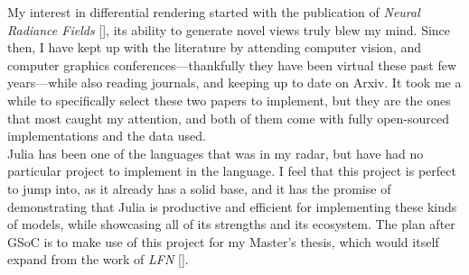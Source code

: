 My interest in differential rendering started with the publication of \textit{Neural Radiance Fields} [\cite{mildenhall2020nerf}], its ability to generate novel views truly blew my mind. Since then, I have kept up with the literature by attending computer vision, and computer graphics conferences---thankfully they have been virtual these past few years---while also reading journals, and keeping up to date on Arxiv. It took me a while to specifically select these two papers to implement, but they are the ones that most caught my attention, and both of them come with fully open-sourced implementations and the data used.\\
Julia has been one of the languages that was in my radar, but have had no particular project to implement in the language. I feel that this project is perfect to jump into, as it already has a solid base, and it has the promise of demonstrating that Julia is productive and efficient for implementing these kinds of models, while showcasing all of its strengths and its ecosystem. The plan after GSoC is to make use of this project for my Master's thesis, which would itself expand from the work of \textit{LFN} [\cite{NEURIPS2021_a11ce019}].



\pagebreak

\printbibliography